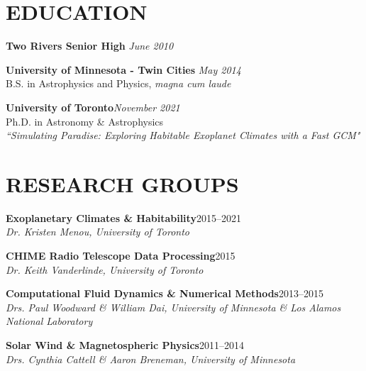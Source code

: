\documentclass[10pt]{res} %
\begin{document}
\begin{resume}

 
\section{EDUCATION}  

\textbf{Two Rivers Senior High} \hfill {\sl June 2010}

\textbf{University of Minnesota - Twin Cities} \hfill {\sl May 2014}\\
B.S. in Astrophysics and Physics, {\sl magna cum laude}

\textbf{University of Toronto}\hfill{\sl November 2021}\\
Ph.D. in Astronomy \& Astrophysics\\
{\sl 
``Simulating Paradise: Exploring Habitable Exoplanet Climates with a Fast GCM"}



\section{RESEARCH GROUPS}

\textbf{Exoplanetary Climates \& Habitability}\hfill 2015--2021\\
\sl{Dr. Kristen Menou, University of Toronto}

\textbf{CHIME Radio Telescope Data Processing}\hfill 2015\\
\sl{Dr. Keith Vanderlinde, University of Toronto}

\textbf{Computational Fluid Dynamics \& Numerical Methods}\hfill 2013--2015\\
\sl{Drs. Paul Woodward \& William Dai, University of Minnesota \& Los Alamos National Laboratory}

\textbf{Solar Wind \& Magnetospheric Physics}\hfill 2011--2014\\
\sl{Drs. Cynthia Cattell \& Aaron Breneman, University of Minnesota}


\end{resume}
\end{document}
